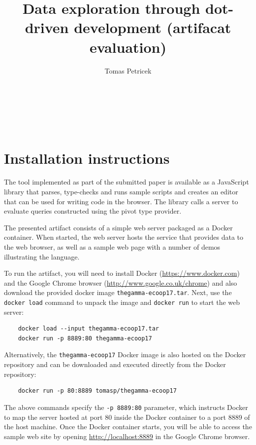 \documentclass[a4paper,UKenglish]{lipics-v2016}
\title{Data exploration through dot-driven development (artifacat evaluation)}
\author[1]{Tomas Petricek}
\affil[1]{The Alan Turing Institute, London, UK\\
  \texttt{tomas@tomasp.net}}
\theoremstyle{plain}
\theoremstyle{definition}
\begin{document}
\maketitle


~

~

\section{Installation instructions}

The tool implemented as part of the submitted paper is available as a JavaScript library that
parses, type-checks and runs sample scripts and creates an editor that can be used for writing
code in the browser. The library calls a server to evaluate queries constructed using the pivot
type provider.

The presented artifact consists of a simple web server packaged as a Docker container. When 
started, the web server hosts the service that provides data to the web browser, as well as
a sample web page with a number of demos illustrating the language.

To run the artifact, you will need to install Docker (\url{https://www.docker.com}) and the
Google Chrome browser (\url{http://www.google.co.uk/chrome}) and also download the provided
docker image \texttt{thegamma-ecoop17.tar}. Next, use the \texttt{docker load} command to 
unpack the image and \texttt{docker run} to start the web server:

\begin{verbatim}
    docker load --input thegamma-ecoop17.tar
    docker run -p 8889:80 thegamma-ecoop17
\end{verbatim}

\noindent
Alternatively, the \texttt{thegamma-ecoop17} Docker image is also hosted on the Docker repository
and can be downloaded and executed directly from the Docker repository:

\begin{verbatim}
    docker run -p 80:8889 tomasp/thegamma-ecoop17
\end{verbatim}

\noindent
The above commands specify the \texttt{-p 8889:80} parameter, which instructs Docker to map the
server hosted at port 80 inside the Docker container to a port 8889 of the host machine. Once
the Docker container starts, you will be able to access the sample web site by opening 
\url{http://localhost:8889} in the Google Chrome browser.
\end{document}
